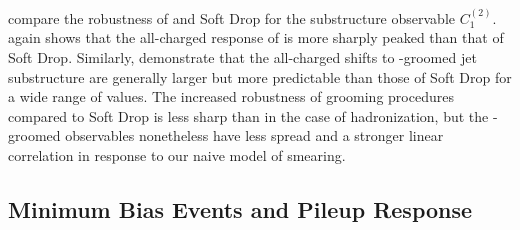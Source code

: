  compare the robustness of  and Soft Drop for the substructure observable \(C_1^{(2)}\).
%
 again shows that the all-charged response of  is more sharply peaked than that of Soft Drop.
%
Similarly,  demonstrate that the all-charged shifts to \PIRANHA{}-groomed jet substructure are generally larger but more predictable than those of Soft Drop for a wide range of \zcut{} values.
%
The increased robustness of \PIRANHA{} grooming procedures compared to Soft Drop is less sharp than in the case of \gls{hadronization}, but the \PIRANHA{}-groomed observables nonetheless have less spread and a stronger linear correlation in response to our naive model of smearing.


\subsection{Minimum Bias Events and Pileup Response}
\label{sec:pira-pu}

